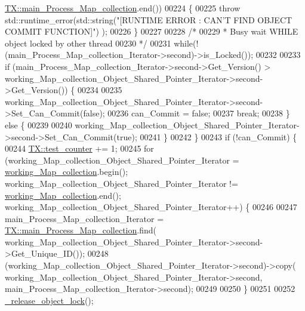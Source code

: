 \begin{DoxyCode}
      \hyperlink{class_t_x_a1a45d726894190695314464d7cd97c29_a1a45d726894190695314464d7cd97c29}{TX::main\_Process\_Map\_collection}.end())
00224             \{
00225                 \textcolor{keywordflow}{throw} std::runtime\_error(std::string(\textcolor{stringliteral}{"[RUNTIME ERROR : CAN'T FIND OBJECT COMMIT FUNCTION]"})
      );
00226             \} 
00227 
00228         \textcolor{comment}{/*}
00229 \textcolor{comment}{         * Busy wait WHILE object locked by other thread}
00230 \textcolor{comment}{         */}
00231         \textcolor{keywordflow}{while}(!(main\_Process\_Map\_collection\_Iterator->second)->is\_Locked());
00232 
00233         \textcolor{keywordflow}{if} (main\_Process\_Map\_collection\_Iterator->second->Get\_Version() > 
      working\_Map\_collection\_Object\_Shared\_Pointer\_Iterator->second->Get\_Version()) \{
00234 
00235             working\_Map\_collection\_Object\_Shared\_Pointer\_Iterator->second->Set\_Can\_Commit(\textcolor{keyword}{false});
00236             can\_Commit = \textcolor{keyword}{false};
00237             \textcolor{keywordflow}{break};
00238         \} \textcolor{keywordflow}{else} \{
00239 
00240             working\_Map\_collection\_Object\_Shared\_Pointer\_Iterator->second->Set\_Can\_Commit(\textcolor{keyword}{true});
00241         \}
00242     \}
00243     \textcolor{keywordflow}{if} (!can\_Commit) \{
00244         \hyperlink{class_t_x_a25838234aab99ae891a90eb8623a8b3c_a25838234aab99ae891a90eb8623a8b3c}{TX::test\_counter} += 1;
00245         \textcolor{keywordflow}{for} (working\_Map\_collection\_Object\_Shared\_Pointer\_Iterator = 
      \hyperlink{class_t_x_a81aafda16e2f20e36ec6c68e584668ff_a81aafda16e2f20e36ec6c68e584668ff}{working\_Map\_collection}.begin(); working\_Map\_collection\_Object\_Shared\_Pointer\_Iterator
       != \hyperlink{class_t_x_a81aafda16e2f20e36ec6c68e584668ff_a81aafda16e2f20e36ec6c68e584668ff}{working\_Map\_collection}.end(); 
      working\_Map\_collection\_Object\_Shared\_Pointer\_Iterator++) \{
00246           
00247             main\_Process\_Map\_collection\_Iterator  = 
      \hyperlink{class_t_x_a1a45d726894190695314464d7cd97c29_a1a45d726894190695314464d7cd97c29}{TX::main\_Process\_Map\_collection}.find(
      working\_Map\_collection\_Object\_Shared\_Pointer\_Iterator->second->Get\_Unique\_ID());
00248             (working\_Map\_collection\_Object\_Shared\_Pointer\_Iterator->second)->copy(
      working\_Map\_collection\_Object\_Shared\_Pointer\_Iterator->second, main\_Process\_Map\_collection\_Iterator->second);
00249 
00250         \}
00251         
00252         \hyperlink{class_t_x_a4c13d2015dc15d0f788fa9a1413f0463_a4c13d2015dc15d0f788fa9a1413f0463}{\_release\_object\_lock}();

\end{DoxyCode}
